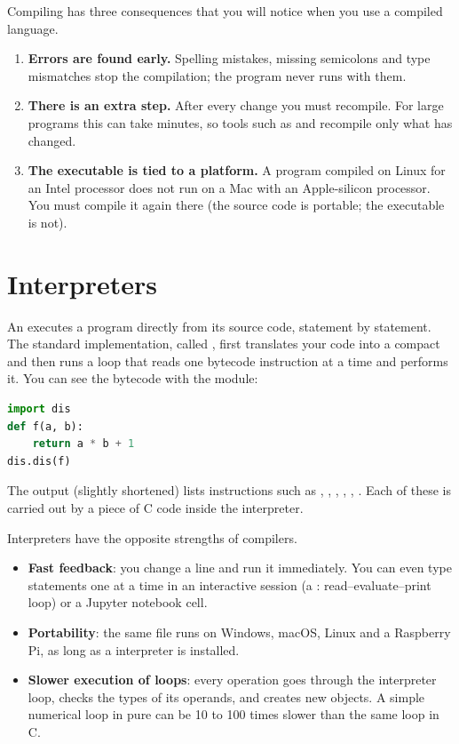 Compiling has three consequences that you will notice when you use a compiled language.
\begin{enumerate}
\item \textbf{Errors are found early.} Spelling mistakes, missing semicolons and type
  mismatches stop the compilation; the program never runs with them.
\item \textbf{There is an extra step.} After every change you must recompile. For large
  programs this can take minutes, so tools such as  and  recompile
  only what has changed.
\item \textbf{The executable is tied to a platform.} A program compiled on Linux for an
  Intel processor does not run on a Mac with an Apple-silicon processor. You must compile
  it again there (the source code is portable; the executable is not).
\end{enumerate}

\section{Interpreters}

An  executes a program directly from its source code, statement by
statement. The standard \py implementation, called , first translates your
code into a compact  and then runs a loop that reads one bytecode
instruction at a time and performs it. You can see the bytecode with the 
module:
\begin{lstlisting}[language=Python]
import dis
def f(a, b):
    return a * b + 1
dis.dis(f)
\end{lstlisting}
The output (slightly shortened) lists instructions such as ,
, , , ,
. Each of these is carried out by a piece of C code inside the
interpreter.

Interpreters have the opposite strengths of compilers.
\begin{itemize}
\item \textbf{Fast feedback}: you change a line and run it immediately. You can even type
  statements one at a time in an interactive session (a : read--evaluate--print
  loop) or a Jupyter notebook cell.
\item \textbf{Portability}: the same  file runs on Windows, macOS, Linux and a
  Raspberry Pi, as long as a \py interpreter is installed.
\item \textbf{Slower execution of loops}: every operation goes through the interpreter
  loop, checks the types of its operands, and creates new objects. A simple numerical loop
  in pure \py can be 10 to 100 times slower than the same loop in C.
\end{itemize}

